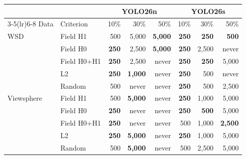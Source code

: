 \begin{tabular}{llrrrrrr}
\toprule
 & & \multicolumn{3}{c}{YOLO26n} & \multicolumn{3}{c}{YOLO26s} \\
\cmidrule(lr){3-5}\cmidrule(lr){6-8}
Data & Criterion & 10\% & 30\% & 50\% & 10\% & 30\% & 50\% \\
\midrule
WSD & Field H1 & 500 & 5,000 & \textbf{5,000} & \textbf{250} & \textbf{250} & \textbf{500} \\
 & Field H0 & \textbf{250} & 2,500 & \textbf{5,000} & \textbf{250} & 2,500 & never \\
 & Field H0+H1 & \textbf{250} & 2,500 & never & \textbf{250} & \textbf{250} & 5,000 \\
 & L2 & \textbf{250} & \textbf{1,000} & never & \textbf{250} & 500 & never \\
 & Random & 500 & never & never & \textbf{250} & 500 & 2,500 \\
\midrule
Viewsphere & Field H1 & 500 & \textbf{5,000} & never & \textbf{250} & 1,000 & 5,000 \\
 & Field H0 & \textbf{250} & never & never & \textbf{250} & \textbf{500} & 5,000 \\
 & Field H0+H1 & \textbf{250} & never & never & 500 & 1,000 & \textbf{2,500} \\
 & L2 & \textbf{250} & \textbf{5,000} & never & \textbf{250} & 1,000 & 5,000 \\
 & Random & 500 & \textbf{5,000} & never & 500 & 2,500 & 5,000 \\
\bottomrule
\end{tabular}
